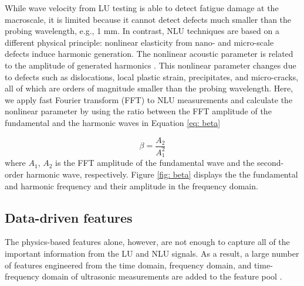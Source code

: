 \begin{itemize}
    While wave velocity from LU testing is able to detect fatigue damage at the macroscale, it is limited because it cannot detect defects much smaller than the probing wavelength, e.g., 1 mm. In contrast, NLU techniques are based on a different physical principle: nonlinear elasticity from nano- and micro-scale defects induce harmonic generation. The nonlinear acoustic parameter is related to the amplitude of generated harmonics \cite{nde-nlu-review-Matlack2014,nde-nlu-fatigue-Cantrell}. This nonlinear parameter changes due to defects such as dislocations, local plastic strain, precipitates, and micro-cracks, all of which are orders of magnitude smaller than the probing wavelength. Here, we apply fast Fourier transform (FFT) to NLU measurements and calculate the nonlinear parameter by using the ratio between the FFT amplitude of the fundamental and the harmonic waves in Equation \eqref{eq: beta}

    \begin{equation}
        \beta = \frac{A_2}{A_1^2}
        \label{eq: beta}
    \end{equation}
    where $A_1$, $A_2$ is the FFT amplitude of the fundamental wave and the second-order harmonic wave, respectively. Figure \ref{fig: beta} displays the the fundamental and harmonic frequency and their amplitude in the frequency domain.
\end{itemize}

\subsection{Data-driven features}
The physics-based features alone, however, are not enough to capture all of the important information from the LU and NLU signals. As a result, a large number of features engineered from the time domain, frequency domain, and time-frequency domain of ultrasonic measurements are added to the feature pool \cite{nde-lu-ml-defect-Sambath2011, nde-lu-ml-defect-s19194216}.

